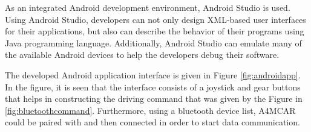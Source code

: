 As an integrated Android development environment, Android Studio \cite{androidstudio} is used. Using Android Studio, developers can not only design XML-based user interfaces for their applications, but also can describe the behavior of their programs using Java programming language. Additionally, Android Studio can emulate many of the available Android devices to help the developers debug their software. 

The developed Android application interface is given in Figure \ref{fig:androidapp}. In the figure, it is seen that the interface consists of a joystick and gear buttons that helps in constructing the driving command that was given by the Figure in \ref{fig:bluetoothcommand}. Furthermore, using a bluetooth device list, A4MCAR could be paired with and then connected in order to start data communication.

